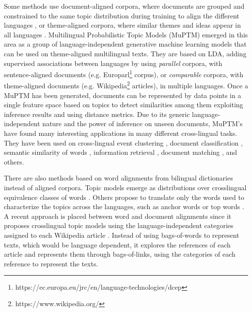 Some methods use document-aligned corpora, where documents are grouped and constrained to the same topic distribution during training to align the different languages \citep{mimno-etal-2009-polylingual, Ni2009, Fukumasu2012, Zhang2013}, or theme-aligned corpora, where similar themes and ideas appear in all languages \citep{Graber2009}. Multilingual Probabilistic Topic Models (MuPTM) \citep{Vulic2015} emerged in this area as a group of language-independent generative machine learning models that can be used on theme-aligned multilingual texts. They are based on LDA, adding supervised associations between languages by using \textit{parallel} corpora, with sentence-aligned documents (e.g. Europarl\footnote{https://ec.europa.eu/jrc/en/language-technologies/dcep} corpus), or \textit{comparable} corpora, with theme-aligned documents (e.g. Wikipedia\footnote{https://www.wikipedia.org/} articles), in multiple languages. Once a MuPTM has been generated, documents can be represented by data points in a single feature space based on topics to detect similarities among them exploiting inference results and using distance metrics. Due to its generic language-independent nature and the power of inference on unseen documents, MuPTM's have found many interesting applications in many different cross-lingual tasks. They have been used on cross-lingual event clustering \citep{Smet2009}, document classification \citep{10.1007/978-3-642-20841-6_45, Ni:2011:CLT:1935826.1935887},  semantic similarity of words \citep{mimno-etal-2009-polylingual, Vulic:2012:DHC:2380816.2380872}, information retrieval \citep{10.1007/978-3-642-36973-5_9, ganguly-etal-2012-cross}, document matching \citep{Platt:2010:TDR:1870658.1870683, zhu-etal-2013-building}, and others. 

There are also methods based on word alignments from bilingual dictionaries instead of aligned corpora. Topic models emerge as distributions over crosslingual equivalence classes of words \citep{Jagarlamudi2010, zhang-etal-2010-cross, shi-etal-2016-detecting, hao-paul-2018-learning}. Others propose to translate only the words used to characterize the topics across the languages, such as anchor words \citep{NEURIPS2018_28b9f8aa} or top words \citep{yang2019multilingual}. A recent approach is placed between word and document alignments since it proposes crosslingual topic models using the language-independent categories assigned to each Wikipedia article \citep{2020arXiv200911207P}. Instead of using bags-of-words to represent texts, which would be language dependent, it explores the references of each article and represents them through bags-of-links, using the categories of each reference to represent the texts.

